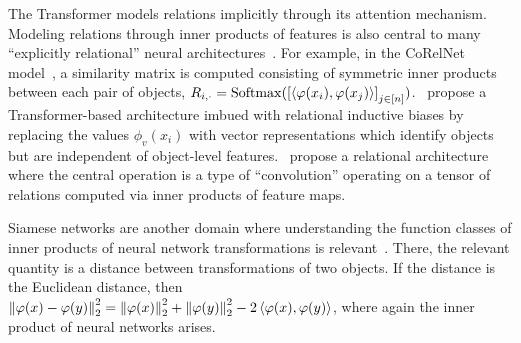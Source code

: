 The Transformer models relations implicitly through its attention mechanism. Modeling relations through inner products of features is also central to many ``explicitly relational'' neural architectures~\parencite[e.g.,][]{webbEmergentSymbols2021,kergNeuralArchitecture2022,altabaaAbstractorsTransformer2023,altabaaRelationalConvolutionalNetworks2023}. For example, in the CoRelNet model~\parencite{kergNeuralArchitecture2022}, a similarity matrix is computed consisting of symmetric inner products between each pair of objects, $R_{i,\cdot} = \mathrm{Softmax}(\left[\left \langle \varphi(x_i), \varphi(x_j) \right\rangle\right]_{j\in[n]})$.~\cite{altabaaRelationalConvolutionalNetworks2023} propose a Transformer-based architecture imbued with relational inductive biases by replacing the values $\phi_v(x_i)$ with vector representations which identify objects but are independent of object-level features.~\cite{altabaaRelationalConvolutionalNetworks2023} propose a relational architecture where the central operation is a type of ``convolution'' operating on a tensor of relations computed via inner products of feature maps.



Siamese networks are another domain where understanding the function classes of inner products of neural network transformations is relevant~\parencite[e.g.,][]{chopraLearningSimilarityMetric2005}. There, the relevant quantity is a distance between transformations of two objects. If the distance is the Euclidean distance, then $\left\lVert\varphi(x) - \varphi(y)\right\rVert_{2}^2 = \left\lVert\varphi(x)\right\rVert_{2}^2 + \left\lVert\varphi(y)\right\rVert_{2}^2 - 2 \left \langle \varphi(x), \varphi(y) \right\rangle$, where again the inner product of neural networks arises.


